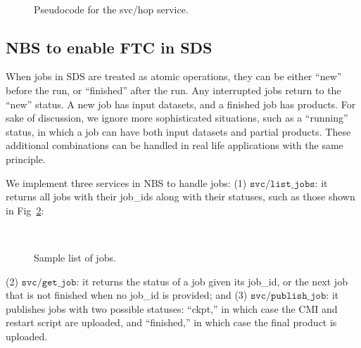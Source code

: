 \documentclass[conference]{IEEEtran}
\begin{document}
\begin{figure}[!ht]
\vspace{0.3in}
\begin{center}
\begin{center}
\mbox{}\\[0.3em]
\end{center}
\hspace{\fill}%
\caption{Pseudocode for the svc/hop service.}
\label{code:svc_hop}
\end{center}
\end{figure}


\subsection{NBS to enable FTC in SDS}
\label{subsec:s23}

When jobs in SDS are treated as atomic operations, they can be either ``new'' before the run, or ``finished'' after the run. Any interrupted jobs return to the ``new'' status. A new job has input datasets, and a finished job has products. For sake of discussion, we ignore more sophisticated situations, such as a ``running'' status, in which a job can have both input datasets and partial products. These additional combinations can be handled in real life applications with the same principle.

We implement three services in NBS to handle jobs:  (1) $\mathtt{svc/list\_jobs}$: it returns all jobs with their job\_ids along with their statuses, such as those shown in Fig~\ref{code:jobs}:

\begin{figure}[!ht]
\vspace{0.3in}
\begin{center}
\begin{center}
\mbox{}\\[0.3em]
\end{center}
\hspace{\fill}%
\caption{Sample list of jobs.}
\label{code:jobs}
\end{center}
\end{figure}

(2) $\mathtt{svc/get\_job}$: it returns the status of a job given its job\_id, or the next job that is not finished when no job\_id is provided; and (3) $\mathtt{svc/publish\_job}$: it publishes jobs with two possible statuses: ``ckpt,'' in which case the CMI and restart script are uploaded, and “finished,” in which case the final product is uploaded.
\end{document}
